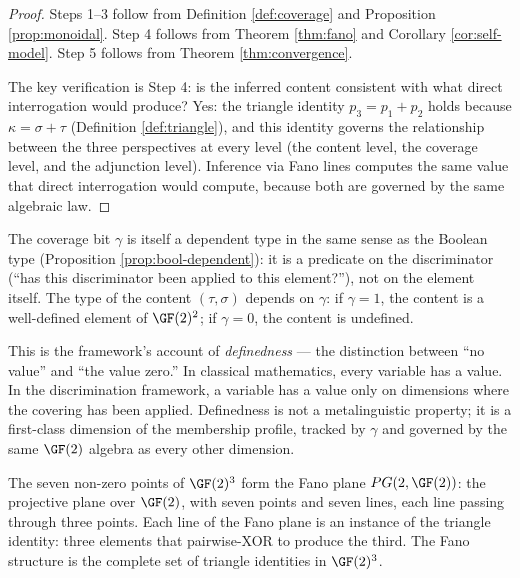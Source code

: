 \begin{proof}
Steps 1--3 follow from Definition \ref{def:coverage} and
Proposition \ref{prop:monoidal}. Step 4 follows from
Theorem \ref{thm:fano} and Corollary \ref{cor:self-model}.
Step 5 follows from Theorem \ref{thm:convergence}.

The key verification is Step 4: is the inferred content
consistent with what direct interrogation would produce?
Yes: the triangle identity $p_3 = p_1 + p_2$ holds
because $\kappa = \sigma + \tau$ (Definition
\ref{def:triangle}), and this identity governs the
relationship between the three perspectives at every
level (the content level, the coverage level, and the
adjunction level). Inference via Fano lines computes
the same value that direct interrogation would compute,
because both are governed by the same algebraic law.
\end{proof}

\begin{remark}
The coverage bit $\gamma$ is itself a dependent type
in the same sense as the Boolean type (Proposition
\ref{prop:bool-dependent}): it is a predicate on the
discriminator (``has this discriminator been applied to
this element?''), not on the element itself. The type
of the content $(\tau, \sigma)$ depends on $\gamma$:
if $\gamma = 1$, the content is a well-defined element
of $\GF(2)^2$; if $\gamma = 0$, the content is
undefined.

This is the framework's account of
\emph{definedness} --- the distinction between ``no
value'' and ``the value zero.'' In classical
mathematics, every variable has a value. In the
discrimination framework, a variable has a value only
on dimensions where the covering has been applied.
Definedness is not a metalinguistic property; it is
a first-class dimension of the membership profile,
tracked by $\gamma$ and governed by the same $\GF(2)$
algebra as every other dimension.
\end{remark}

\begin{theorem}
\label{thm:fano}
The seven non-zero points of $\GF(2)^3$ form the Fano
plane $PG(2, \GF(2))$: the projective plane over $\GF(2)$,
with seven points and seven lines, each line passing through
three points. Each line of the Fano plane is an instance
of the triangle identity: three elements that pairwise-XOR
to produce the third. The Fano structure is the complete
set of triangle identities in $\GF(2)^3$.
\end{theorem}

